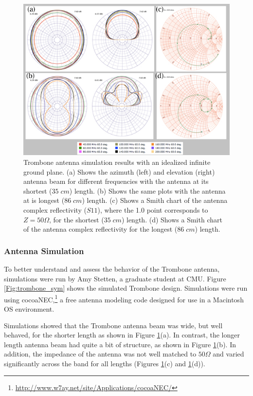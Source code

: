 \begin{figure}[htb]
\begin{center}
\includegraphics[width=0.95\linewidth]{SCIHI_system/figures/trombone_no_gp.jpg}
\caption{Trombone antenna simulation results with an idealized infinite ground plane. (a) Shows the azimuth (left) and elevation (right) antenna beam for different frequencies with the antenna at its shortest ($35 \; cm$) length. (b) Shows the same plots with the antenna at is longest ($86 \; cm$) length. (c) Shows a Smith chart of the antenna complex reflectivity ($S11$), where the 1.0 point corresponds to $Z = 50 \Omega$, for the shortest ($35 \; cm$) length. (d) Shows a Smith chart of the antenna complex reflectivity for the longest ($86 \; cm$) length. }
\label{Fig:trsym_nogp}
\end{center}
\end{figure}

\subsubsection{Antenna Simulation}

To better understand and assess the behavior of the Trombone antenna, simulations were run by Amy Stetten, a graduate student at CMU. Figure \ref{Fig:trombone_sym} shows the simulated Trombone design. Simulations were run using cocoaNEC,\footnote{\url{http://www.w7ay.net/site/Applications/cocoaNEC/}} a free antenna modeling code designed for use in a Macintosh OS environment. 

Simulations showed that the Trombone antenna beam was wide, but well behaved, for the shorter length as shown in Figure \ref{Fig:trsym_nogp}(a). In contrast, the longer length antenna beam had quite a bit of structure, as shown in Figure \ref{Fig:trsym_nogp}(b). In addition, the impedance of the antenna was not well matched to $50 \Omega$ and varied significantly across the band for all lengths (Figures \ref{Fig:trsym_nogp}(c) and \ref{Fig:trsym_nogp}(d)). 

